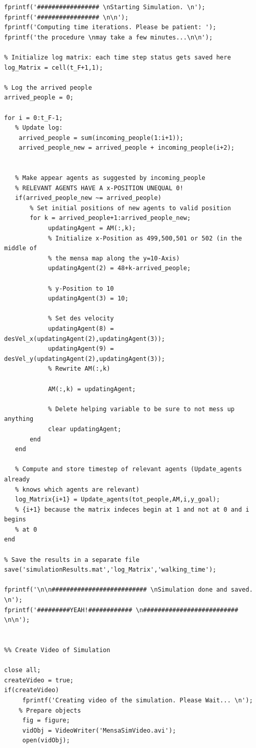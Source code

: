 \documentclass[11pt]{article}
\begin{document}
\begin{lstlisting}[frame=lines]
%% Actual Simulation
fprintf('################# \nStarting Simulation. \n');
fprintf('################# \n\n');
fprintf('Computing time iterations. Please be patient: ');
fprintf('the procedure \nmay take a few minutes...\n\n');

% Initialize log matrix: each time step status gets saved here
log_Matrix = cell(t_F+1,1);

% Log the arrived people
arrived_people = 0;

for i = 0:t_F-1;
   % Update log:
    arrived_people = sum(incoming_people(1:i+1));
    arrived_people_new = arrived_people + incoming_people(i+2);
   
   
   % Make appear agents as suggested by incoming_people
   % RELEVANT AGENTS HAVE A x-POSITION UNEQUAL 0!
   if(arrived_people_new ~= arrived_people)
       % Set initial positions of new agents to valid position
       for k = arrived_people+1:arrived_people_new;
            updatingAgent = AM(:,k);
            % Initialize x-Position as 499,500,501 or 502 (in the middle of
            % the mensa map along the y=10-Axis) 
            updatingAgent(2) = 48+k-arrived_people;
            
            % y-Position to 10
            updatingAgent(3) = 10;
            
            % Set des velocity
            updatingAgent(8) = desVel_x(updatingAgent(2),updatingAgent(3));
            updatingAgent(9) = desVel_y(updatingAgent(2),updatingAgent(3));
            % Rewrite AM(:,k)
            
            AM(:,k) = updatingAgent;
             
            % Delete helping variable to be sure to not mess up anything
            clear updatingAgent;     
       end
   end
   
   % Compute and store timestep of relevant agents (Update_agents already
   % knows which agents are relevant)
   log_Matrix{i+1} = Update_agents(tot_people,AM,i,y_goal); 
   % {i+1} because the matrix indeces begin at 1 and not at 0 and i begins
   % at 0
end
    
% Save the results in a separate file
save('simulationResults.mat','log_Matrix','walking_time');

fprintf('\n\n########################## \nSimulation done and saved. \n');
fprintf('#########YEAH!############ \n########################## \n\n');


%% Create Video of Simulation

close all;
createVideo = true;
if(createVideo)
     fprintf('Creating video of the simulation. Please Wait... \n');
    % Prepare objects
     fig = figure;
     vidObj = VideoWriter('MensaSimVideo.avi');
     open(vidObj);
     

\end{lstlisting}
\end{document}
